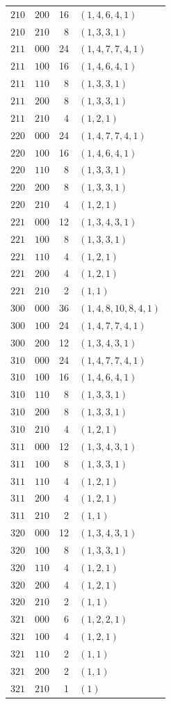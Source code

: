 \documentclass[11pt]{article}
\begin{document}
{\begin{longtable}{@{}ccrl@{}}
$210$ & $200$ & 16 & $(1,4,6,4,1)$ \\
$210$ & $210$ & 8 & $(1,3,3,1)$ \\
$211$ & $000$ & 24 & $(1,4,7,7,4,1)$ \\
$211$ & $100$ & 16 & $(1,4,6,4,1)$ \\
$211$ & $110$ & 8 & $(1,3,3,1)$ \\
$211$ & $200$ & 8 & $(1,3,3,1)$ \\
$211$ & $210$ & 4 & $(1,2,1)$ \\
$220$ & $000$ & 24 & $(1,4,7,7,4,1)$ \\
$220$ & $100$ & 16 & $(1,4,6,4,1)$ \\
$220$ & $110$ & 8 & $(1,3,3,1)$ \\
$220$ & $200$ & 8 & $(1,3,3,1)$ \\
$220$ & $210$ & 4 & $(1,2,1)$ \\
$221$ & $000$ & 12 & $(1,3,4,3,1)$ \\
$221$ & $100$ & 8 & $(1,3,3,1)$ \\
$221$ & $110$ & 4 & $(1,2,1)$ \\
$221$ & $200$ & 4 & $(1,2,1)$ \\
$221$ & $210$ & 2 & $(1,1)$ \\
$300$ & $000$ & 36 & $(1,4,8,10,8,4,1)$ \\
$300$ & $100$ & 24 & $(1,4,7,7,4,1)$ \\
$300$ & $200$ & 12 & $(1,3,4,3,1)$ \\
$310$ & $000$ & 24 & $(1,4,7,7,4,1)$ \\
$310$ & $100$ & 16 & $(1,4,6,4,1)$ \\
$310$ & $110$ & 8 & $(1,3,3,1)$ \\
$310$ & $200$ & 8 & $(1,3,3,1)$ \\
$310$ & $210$ & 4 & $(1,2,1)$ \\
$311$ & $000$ & 12 & $(1,3,4,3,1)$ \\
$311$ & $100$ & 8 & $(1,3,3,1)$ \\
$311$ & $110$ & 4 & $(1,2,1)$ \\
$311$ & $200$ & 4 & $(1,2,1)$ \\
$311$ & $210$ & 2 & $(1,1)$ \\
$320$ & $000$ & 12 & $(1,3,4,3,1)$ \\
$320$ & $100$ & 8 & $(1,3,3,1)$ \\
$320$ & $110$ & 4 & $(1,2,1)$ \\
$320$ & $200$ & 4 & $(1,2,1)$ \\
$320$ & $210$ & 2 & $(1,1)$ \\
$321$ & $000$ & 6 & $(1,2,2,1)$ \\
$321$ & $100$ & 4 & $(1,2,1)$ \\
$321$ & $110$ & 2 & $(1,1)$ \\
$321$ & $200$ & 2 & $(1,1)$ \\
$321$ & $210$ & 1 & $(1)$ \\
\end{longtable}
}

\small


\end{document}
